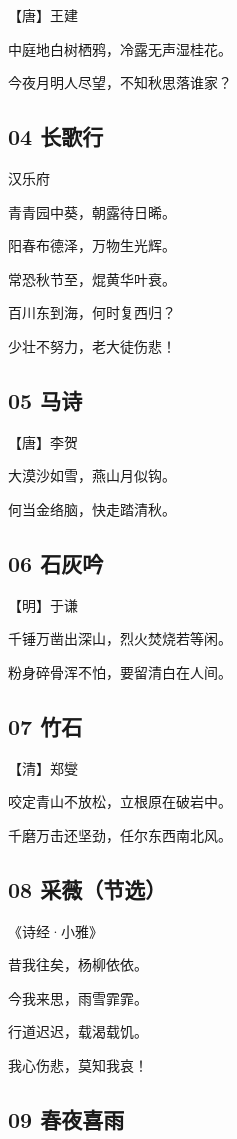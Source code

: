 \documentclass[a6paper, 12pt]{article}
\begin{document}
【唐】王建

中庭地白树栖鸦，冷露无声湿桂花。

今夜月明人尽望，不知秋思落谁家？

\subsection*{04 长歌行}

汉乐府

青青园中葵，朝露待日晞。

阳春布德泽，万物生光辉。

常恐秋节至，焜黄华叶衰。

百川东到海，何时复西归？

少壮不努力，老大徒伤悲！

\subsection*{05 马诗}

【唐】李贺

大漠沙如雪，燕山月似钩。

何当金络脑，快走踏清秋。

\subsection*{06 石灰吟}

【明】于谦

千锤万凿出深山，烈火焚烧若等闲。

粉身碎骨浑不怕，要留清白在人间。

\subsection*{07 竹石}

【清】郑燮

咬定青山不放松，立根原在破岩中。

千磨万击还坚劲，任尔东西南北风。

\subsection*{08 采薇（节选）}

《诗经·小雅》

昔我往矣，杨柳依依。

今我来思，雨雪霏霏。

行道迟迟，载渴载饥。

我心伤悲，莫知我哀！

\subsection*{09 春夜喜雨}
\end{document}
